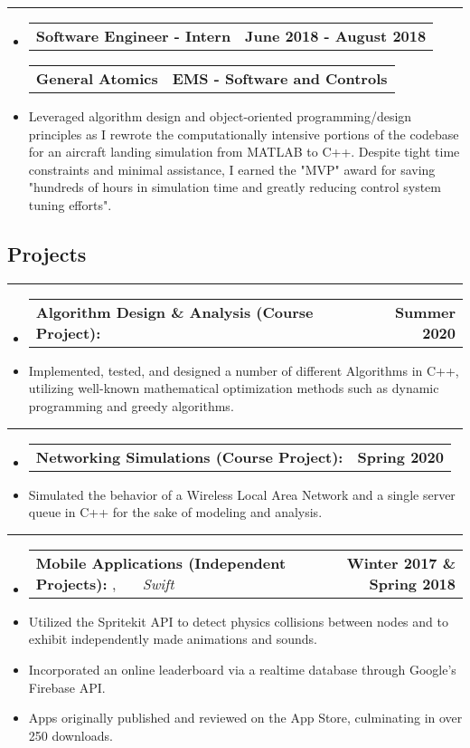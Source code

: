 \documentclass[10pt,letterpaper]{article}
\makeatletter
\newcommand{\header}[2]
{
	\begin{tabular*}{\linewidth}{l @{\extracolsep{\fill}} r}
		\hspace{-27pt} #1 & #2 \\
	\end{tabular*}
}
\newcommand{\sectionbreak}
{
	\vspace{-1.2em}
	\rule{\textwidth}{1.7pt}
	\vspace{-1.7em}
}
\makeatother
\begin{document}
\hrule

\begin{itemize}
	\item[]
		\header
		{\textbf{Software Engineer - Intern}} 
		{\textbf{June 2018 - August 2018}}
		\header
		{\textbf{General Atomics}}
		{\textbf{EMS - Software and Controls}} 
	\item
		Leveraged algorithm design and object-oriented programming/design principles as I rewrote the computationally intensive portions of the codebase for an aircraft landing simulation from MATLAB to C++. Despite tight time constraints and minimal assistance, I earned the "MVP" award for saving "hundreds of hours in simulation time and greatly reducing control system tuning efforts".


\end{itemize}

\vspace{-1.5em}

\subsection*{Projects}
\sectionbreak


\begin{itemize}
	\item[]
		\header
		{
			\textbf{Algorithm Design \& Analysis (Course Project): }
		}
		{\textbf{Summer 2020}}
	\item 
		Implemented, tested, and designed a number of different Algorithms in C++, utilizing well-known mathematical optimization methods such as dynamic programming and greedy algorithms. 

\end{itemize}

\hrule

\begin{itemize}
\item[]
	\header
	{
		\textbf{Networking Simulations (Course Project): }
	}
	{\textbf{Spring 2020}}
\item 
	Simulated the behavior of a Wireless Local Area Network and a single server queue in C++ for the sake of modeling and analysis. 
\end{itemize}

\hrule

\begin{itemize}
	\item[]
		\header
		{
			\textbf{Mobile Applications (Independent Projects): }
			\href{https://appadvice.com/app/round-bound/1369632746}{\emph{\underline{\smash{Round 'a Bound}}}}, 
			\href{https://appadvice.com/app/tic-tac-emoji/1346934986}{\emph{\underline{\smash{Tic-Tac Emoji}}}} \ \ \ \footnotesize  \emph{Swift}
		}
		{\textbf{Winter 2017 \& Spring 2018}}
	\item 
		Utilized the Spritekit API to detect physics collisions between nodes and to exhibit independently made animations and sounds.
	\item
		Incorporated an online leaderboard via a realtime database through Google's Firebase API.
	\item
		Apps originally published and reviewed on the App Store, culminating in over 250 downloads.
\end{itemize}
\end{document}
